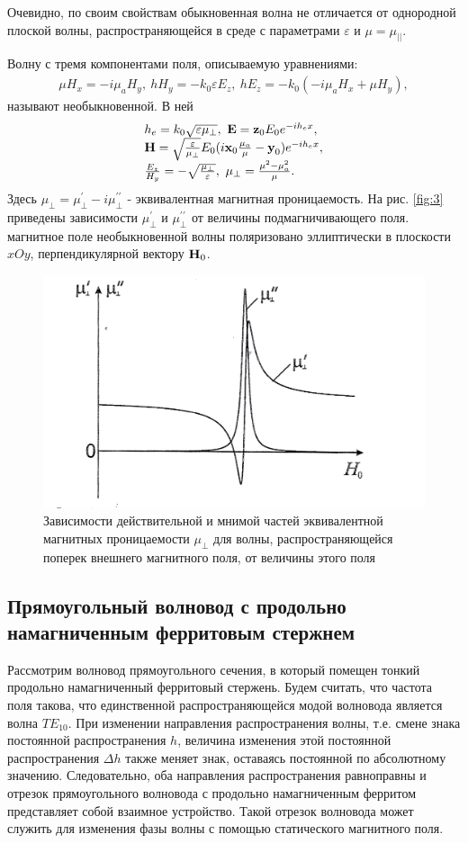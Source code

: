 Очевидно, по своим свойствам обыкновенная волна не отличается от однородной плоской волны, распространяющейся в среде с параметрами $\varepsilon$ и $\mu=\mu_{||}$.

Волну с тремя компонентами поля, описываемую уравнениями:
\begin{equation}
    \begin{array}
    	{ll}{\mu H_x=-i\mu_a H_y,~ hH_y = -k_0\varepsilon E_z,~ hE_z=-k_0(-i\mu_a H_x + \mu H_y)}, \end{array}
    \label{eq:2:14}
\end{equation}
называют необыкновенной. В ней
\begin{equation}
    \begin{array}
    	{ll}{h_e=k_0\sqrt{\varepsilon \mu_{\bot}},~\textbf{E}=\textbf{z}_0 E_0 e^{-ih_ex}}, \\ 
    	{\textbf{H}= \sqrt{\frac{\varepsilon}{\mu_{\bot}}} E_0(i\textbf{x}_0 \frac{\mu_a}{\mu}-\textbf{y}_0)e^{-ih_ex}}, \\
    	{\frac{E_z}{H_y}=-\sqrt{\frac{\mu_{\bot}}{\varepsilon}},~\mu_{\bot}=\frac{\mu^2-\mu_a^2}{\mu}}. \end{array}
    \label{eq:2:15}
\end{equation}
Здесь $\mu_{\bot}=\mu_{\bot}^{\prime}-i\mu_{\bot}^{\prime \prime}$ - эквивалентная магнитная проницаемость. На рис. \ref{fig:3} приведены зависимости $\mu_{\bot}^{\prime}$ и $\mu_{\bot}^{\prime \prime}$ от величины подмагничивающего поля. магнитное поле необыкновенной волны поляризовано эллиптически в плоскости $xOy$, перпендикулярной вектору $\textbf{H}_0$.
\begin{figure}[H]
    \centering
    \includegraphics[width = 0.5\linewidth]{imgs/temp/004.JPG}
    \caption{Зависимости действительной и мнимой частей эквивалентной магнитных проницаемости
    $\mu_{\bot}$ для волны, распространяющейся поперек внешнего магнитного поля, от величины этого поля}
    \label{fig:4}
\end{figure}
\subsection{Прямоугольный волновод с продольно намагниченным ферритовым стержнем}
Рассмотрим волновод прямоугольного сечения, в который помещен тонкий продольно намагниченный ферритовый стержень. Будем
считать, что частота поля такова, что единственной распространяющейся модой волновода является волна $TE_{10}$. При
изменении направления распространения волны, т.е. смене знака постоянной распространения $h$, величина изменения этой
постоянной распространения $\Delta h$ также меняет знак, оставаясь постоянной по абсолютному значению. Следовательно,
оба направления распространения равноправны и отрезок прямоугольного волновода с продольно намагниченным ферритом
представляет собой взаимное устройство. Такой отрезок волновода может служить для изменения фазы волны с помощью
статического магнитного поля.
